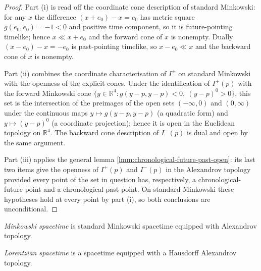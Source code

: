 \begin{proof}
    \leanok
    Part (i) is read off the coordinate cone description of standard Minkowski: for any $x$ the difference $(x + e_0) - x = e_0$ has metric square $g(e_0, e_0) = -1 < 0$ and positive time component, so it is future-pointing timelike; hence $x \ll x + e_0$ and the forward cone of $x$ is nonempty. Dually $(x - e_0) - x = -e_0$ is past-pointing timelike, so $x - e_0 \ll x$ and the backward cone of $x$ is nonempty.

    Part (ii) combines the coordinate characterisation of $I^\pm$ on standard Minkowski with the openness of the explicit cones. Under the identification of $I^+(p)$ with the forward Minkowski cone $\{y \in \mathbb{R}^4 : g(y - p, y - p) < 0,\ (y - p)^0 > 0\}$, this set is the intersection of the preimages of the open sets $(-\infty, 0)$ and $(0, \infty)$ under the continuous maps $y \mapsto g(y - p, y - p)$ (a quadratic form) and $y \mapsto (y - p)^0$ (a coordinate projection); hence it is open in the Euclidean topology on $\mathbb{R}^4$. The backward cone description of $I^-(p)$ is dual and open by the same argument.

    Part (iii) applies the general lemma \ref{lmm:chronological-future-past-open}: its last two items give the openness of $I^+(p)$ and $I^-(p)$ in the Alexandrov topology provided every point of the set in question has, respectively, a chronological-future point and a chronological-past point. On standard Minkowski these hypotheses hold at every point by part (i), so both conclusions are unconditional.
\end{proof}

\begin{definition}
    \label{def:minkowski-spacetime}
    \leanok
    \textit{Minkowski spacetime} is standard Minkowski spacetime equipped with Alexandrov topology.
\end{definition}

\begin{definition}
    \label{def:lorentzian-spacetime}
    \leanok
    \textit{Lorentzian spacetime} is a spacetime equipped with a Hausdorff Alexandrov topology.
\end{definition}

